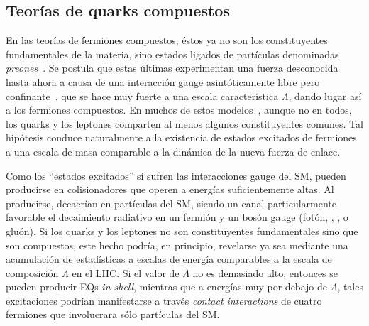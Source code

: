 \subsection{Teor\'ias de quarks compuestos}
\label{subsec:theory:bsm:qstar}

En las teorías de fermiones compuestos, éstos ya no son los constituyentes fundamentales de la materia, sino estados ligados de partículas denominadas \textit{preones}~\cite{Pfeil-1981}. Se postula que estas últimas experimentan una fuerza desconocida hasta ahora a causa de una interacción gauge asintóticamente libre pero confinante~\cite{Hooft-1980}, que se hace muy fuerte a una escala característica \(\Lambda\), dando lugar así a los fermiones compuestos. En muchos de estos modelos~\cite{Pati_Salam_Strathdee-1975,Fritzsch_Mandelbaum-1981,Baur_Fritzsch-1984}, aunque no en todos, los quarks y los leptones comparten al menos algunos constituyentes comunes. Tal hipótesis conduce naturalmente a la existencia de estados excitados de fermiones a una escala de masa comparable a la dinámica de la nueva fuerza de enlace.

Como los \enquote{estados excitados} sí sufren las interacciones gauge del \ac{SM}, pueden producirse en colisionadores que operen a energías suficientemente altas. Al producirse, decaerían en partículas del \ac{SM}, siendo un canal particularmente favorable el decaimiento radiativo en un fermión y un bosón gauge (fotón, \Wboson, \Zboson, o gluón). Si los quarks y los leptones no son constituyentes fundamentales sino que son compuestos, este hecho podría, en principio, revelarse ya sea mediante una acumulación de estadísticas a escalas de energía comparables a la escala de composición \(\Lambda\) en el \ac{LHC}. Si el valor de \(\Lambda\) no es demasiado alto, entonces se pueden producir \acp{EQ} \textit{in-shell}, mientras que a energías muy por debajo de \(\Lambda\), tales excitaciones podrían manifestarse a través \textit{contact interactions} de cuatro fermiones que involucrara sólo partículas del \ac{SM}.

